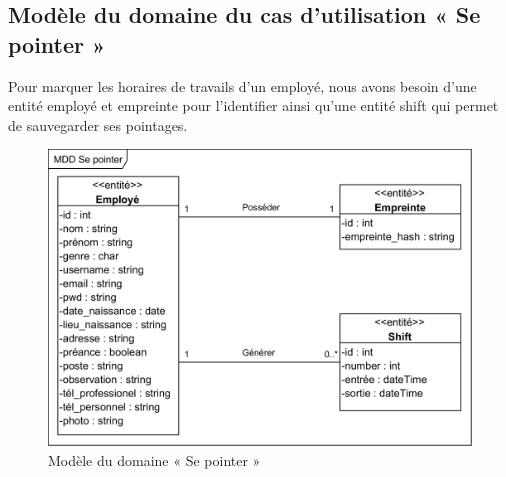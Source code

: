 \begin{itemize}
        \subsection*{Modèle du domaine du cas d'utilisation « Se pointer »}
        Pour marquer les horaires de travails d’un employé, nous avons besoin d’une entité employé et empreinte pour l’identifier ainsi qu’une entité shift qui permet de sauvegarder ses pointages. 
            \begin{figure}[h!]
                 \centering
                \includegraphics[scale=1.3]{images/MDD/MDD Se pointer.png}
                 \caption{Modèle du domaine « Se pointer »}
                 \label{fig12}
            \end{figure}



\end{itemize}
